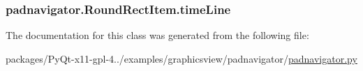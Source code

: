\subsubsection[{time\+Line}]{\setlength{\rightskip}{0pt plus 5cm}padnavigator.\+Round\+Rect\+Item.\+time\+Line}\label{classpadnavigator_1_1RoundRectItem_a0146286ed7d625300fb6c4e622af8705}


The documentation for this class was generated from the following file\+:\begin{DoxyCompactItemize}
\item 
packages/\+Py\+Qt-\/x11-\/gpl-\/4../examples/graphicsview/padnavigator/\hyperlink{padnavigator_8py}{padnavigator.\+py}\end{DoxyCompactItemize}
